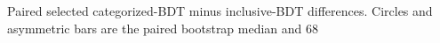 Paired selected categorized-BDT minus inclusive-BDT differences. Circles and asymmetric bars are the paired bootstrap median and 68%
